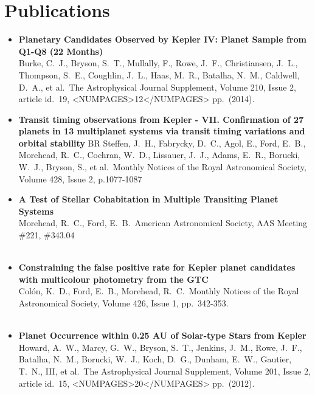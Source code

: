\documentclass[11pt,letterpaper,sans]{moderncv} %
\begin{document}
\section{Publications}
\begin{itemize}
 \item \textbf{ Planetary Candidates Observed by Kepler IV: Planet 
Sample from Q1-Q8 (22 Months) } \\ Burke, C.~J., Bryson, S.~T., Mullally, 
F., Rowe, J.~F., Christiansen, J.~L., Thompson, S.~E., Coughlin, J.~L., 
Haas, M.~R., Batalha, N.~M., Caldwell, D.~A., et al.\ The Astrophysical 
Journal Supplement, Volume 210, Issue 2, article id.~19, <NUMPAGES>12</NUMPAGES> pp.~(2014).\ 
\\ 

 \item \textbf{ Transit timing observations from Kepler - VII. 
Confirmation of 27 planets in 13 multiplanet systems via transit timing 
variations and orbital stability } BR Steffen, J.~H., Fabrycky, D.~C., 
Agol, E., Ford, E.~B., Morehead, R.~C., Cochran, W.~D., Lissauer, J.~J., 
Adams, E.~R., Borucki, W.~J., Bryson, S., et al.\ Monthly Notices of the 
Royal Astronomical Society, Volume 428, Issue 2, p.1077-1087 \\ 

 \item \textbf{ A Test of Stellar Cohabitation in Multiple Transiting 
Planet Systems } \\ Morehead, R.~C., Ford, E.~B.\ American Astronomical 
Society, AAS Meeting \#221, \#343.04 \\ \\ 

 \item \textbf{ Constraining the false positive rate for Kepler planet 
candidates with multicolour photometry from the GTC } \\ Col{\'o}n, K.~D., 
Ford, E.~B., Morehead, R.~C.\ Monthly Notices of the Royal Astronomical 
Society, Volume 426, Issue 1, pp.~342-353.\ \\ \\ 

 \item \textbf{ Planet Occurrence within 0.25 AU of Solar-type Stars 
from Kepler } \\ Howard, A.~W., Marcy, G.~W., Bryson, S.~T., Jenkins, 
J.~M., Rowe, J.~F., Batalha, N.~M., Borucki, W.~J., Koch, D.~G., Dunham, 
E.~W., Gautier, T.~N., III, et al.\ The Astrophysical Journal Supplement, 
Volume 201, Issue 2, article id.~15, <NUMPAGES>20</NUMPAGES> pp.~(2012).\ \\ \\ 


\end{itemize}
\end{document}

